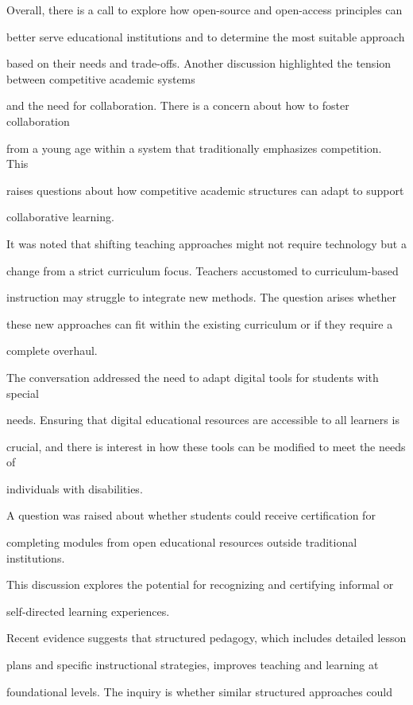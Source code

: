 \documentclass[11pt]{article}
\begin{document}
Overall, there is a call to explore how open-source and open-access principles can

better serve educational institutions and to determine the most suitable approach

based on their needs and trade-offs. Another discussion highlighted the tension between competitive academic systems

and the need for collaboration. There is a concern about how to foster collaboration

from a young age within a system that traditionally emphasizes competition. This

raises questions about how competitive academic structures can adapt to support

collaborative learning.

It was noted that shifting teaching approaches might not require technology but a

change from a strict curriculum focus. Teachers accustomed to curriculum-based

instruction may struggle to integrate new methods. The question arises whether

these new approaches can fit within the existing curriculum or if they require a

complete overhaul.

The conversation addressed the need to adapt digital tools for students with special

needs. Ensuring that digital educational resources are accessible to all learners is

crucial, and there is interest in how these tools can be modified to meet the needs of

individuals with disabilities.

A question was raised about whether students could receive certification for

completing modules from open educational resources outside traditional institutions.

This discussion explores the potential for recognizing and certifying informal or

self-directed learning experiences.

Recent evidence suggests that structured pedagogy, which includes detailed lesson

plans and specific instructional strategies, improves teaching and learning at

foundational levels. The inquiry is whether similar structured approaches could
\end{document}
